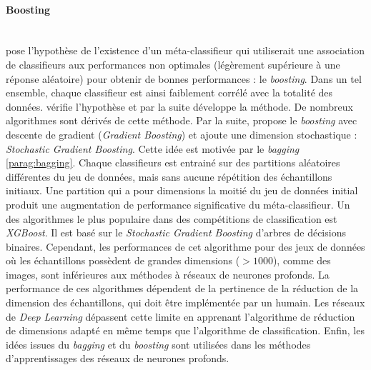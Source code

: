 \paragraph{Boosting}\mbox{\label{parag:boosting}} \\
\cite{kearns_thoughts_1988} pose l'hypothèse de l'existence d'un méta-classifieur qui utiliserait une association de classifieurs aux performances non optimales (légèrement supérieure à une réponse aléatoire) pour obtenir de bonnes performances : le \textit{boosting}.
Dans un tel ensemble, chaque classifieur est ainsi faiblement corrélé avec la totalité des données.
\cite{schapire_strength_1990} vérifie l'hypothèse et par la suite \cite{breiman_bias_1996, breiman_arcing_1997} développe la méthode.
De nombreux algorithmes sont dérivés de cette méthode.
Par la suite, \cite{mason_boosting_1999, friedman_greedy_2001} propose le \textit{boosting} avec descente de gradient (\textit{Gradient Boosting}) et \cite{friedman_stochastic_2002} ajoute une dimension stochastique : \textit{Stochastic Gradient Boosting}.
Cette idée est motivée par le \textit{bagging} \ref{parag:bagging}.
Chaque classifieurs est entrainé sur des partitions aléatoires différentes du jeu de données, mais sans aucune répétition des échantillons initiaux.
Une partition qui a pour dimensions la moitié du jeu de données initial produit une augmentation de performance significative du méta-classifieur.
Un des algorithmes le plus populaire dans des compétitions de classification est \textit{XGBoost}.
Il est basé sur le \textit{Stochastic Gradient Boosting} d'arbres de décisions binaires.
Cependant, les performances de cet algorithme pour des jeux de données où les échantillons possèdent de grandes dimensions ($> 1000$), comme des images, sont inférieures aux méthodes à réseaux de neurones profonds.
La performance de ces algorithmes dépendent de la pertinence de la réduction de la dimension des échantillons, qui doit être implémentée par un humain.
Les réseaux de \textit{Deep Learning} dépassent cette limite en apprenant l'algorithme de réduction de dimensions adapté en même temps que l'algorithme de classification.
Enfin, les idées issues du \textit{bagging} et du \textit{boosting} sont utilisées dans les méthodes d'apprentissages des réseaux de neurones profonds.

